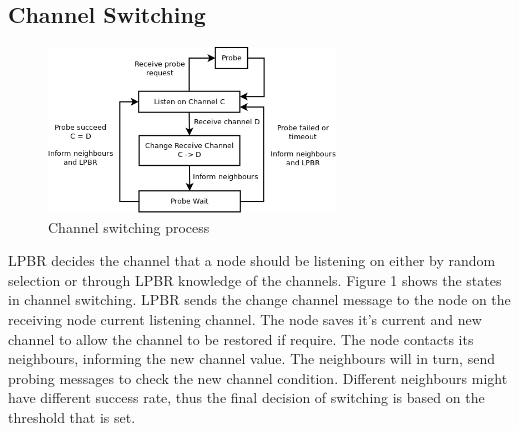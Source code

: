 


\subsection{Channel Switching}



\begin{figure}
\centering
\includegraphics[width=3in]{Diagram1}
\caption{Channel switching process}
\label{fig_sim}
\end{figure}

LPBR decides the channel that a node should be listening on either by random selection or through LPBR knowledge of the channels. Figure 1 shows the states in channel switching. LPBR sends the change channel message to the node on the receiving node current listening channel. The node saves it's current and new channel to allow the channel to be restored if require. The node contacts its neighbours, informing the new channel value. The neighbours will in turn, send probing messages to check the new channel condition. Different neighbours might have different success rate, thus the final decision of switching is based on the threshold that is set. 

